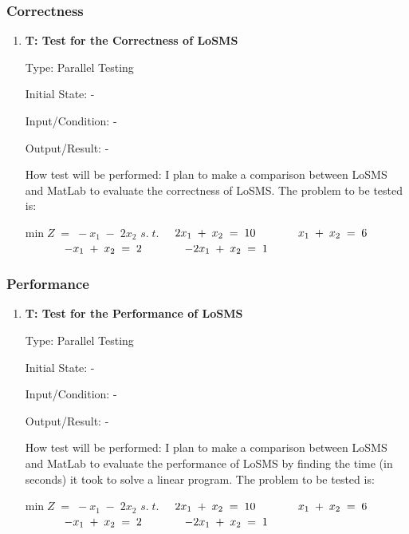 \documentclass[12pt, titlepage]{article}
\newcounter{testnum} %
\newcommand{\famname}{LoSMS}
\begin{document}
\subsubsection{Correctness}

\begin{enumerate}
	\item{\textbf{T\thetestnum \label{Correctness}: 
	Test for the Correctness of \famname{}}}
	
	Type: Parallel Testing
	
	Initial State: -
	
	Input/Condition: -
	
	Output/Result: -
	
	How test will be performed: I plan to make a comparison between \famname{} 
	and MatLab to evaluate the correctness of \famname{}. The problem to be 
	tested is:
	
	min$\;Z\;=\;-x_1\;-\;2x_2$\newline
	$s.\;t.$$\hspace*{0.5cm} 2x_1\;+\;x_2\; = \;10$\newline
	$\hspace*{1.2cm} x_1\;+\;x_2\; = \;6$\newline
	$\hspace*{1.2cm} -x_1\;+\;x_2\; = \;2$\newline
	$\hspace*{1.2cm} -2x_1\;+\;x_2\; = \;1$\newline
\end{enumerate}

\subsubsection{Performance}

\begin{enumerate}
	\item{\textbf{T\thetestnum \label{Performance}: 
			Test for the Performance of \famname{}}}
	
	Type: Parallel Testing
	
	Initial State: -
	
	Input/Condition: -
	
	Output/Result: -
	
	How test will be performed: I plan to make a comparison between \famname{} 
	and MatLab to evaluate the performance of \famname{} by finding the time 
	(in seconds) it took to solve a linear program. The problem to be tested is:

	min$\;Z\;=\;-x_1\;-\;2x_2$\newline
	$s.\;t.$$\hspace*{0.5cm} 2x_1\;+\;x_2\; = \;10$\newline
	$\hspace*{1.2cm} x_1\;+\;x_2\; = \;6$\newline
	$\hspace*{1.2cm} -x_1\;+\;x_2\; = \;2$\newline
	$\hspace*{1.2cm} -2x_1\;+\;x_2\; = \;1$\newline
\end{enumerate}
\end{document}
